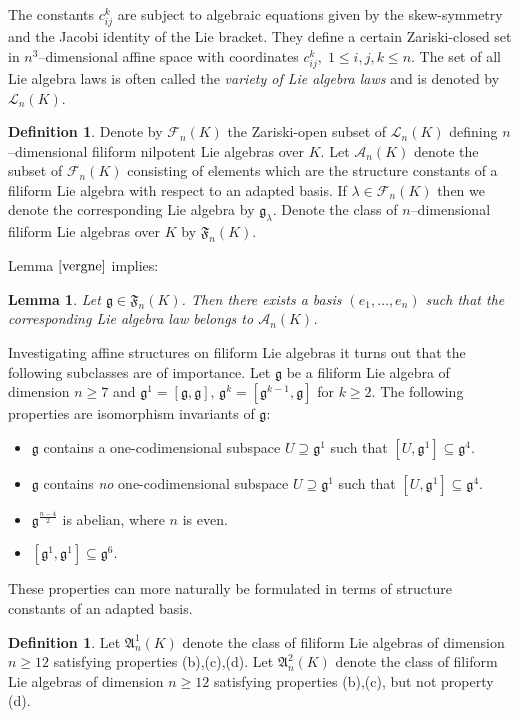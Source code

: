 \documentclass[12pt]{amsart}
\newtheorem{lem}[thm]{Lemma}
\theoremstyle{definition}
\newtheorem{defi}[thm]{Definition}
\theoremstyle{remark}
\newcommand{\Lg}{\mathfrak{g}}
\newcommand{\LA}{\mathfrak{A}}
\newcommand{\LF}{\mathfrak{F}}
\newcommand{\CA}{\mathcal{A}}
\newcommand{\CL}{\mathcal{L}}
\newcommand{\CF}{\mathcal{F}}
\newcommand{\la}{\lambda}
\begin{document}
The constants $c_{ij}^k$ are subject to algebraic equations given by
the skew-symmetry and the Jacobi identity of the Lie bracket.
They define a certain Zariski-closed set in $n^3$--dimensional affine
space with coordinates $c_{ij}^k,\; 1\le i,j,k \le n$.
The set of all Lie algebra laws is often called the {\it variety of
Lie algebra laws} and is denoted by $\CL_n(K)$.

\begin{defi}
Denote by $\CF_n(K)$ the Zariski-open subset of $\CL_n(K)$ defining 
$n$--di\-men\-sio\-nal 
filiform nilpotent Lie algebras over $K$. Let $\CA_n(K)$ denote the subset of
$\CF_n(K)$ consisting of elements which are the structure constants of a
filiform Lie algebra with respect to an adapted basis.
If $\la\in\CF_n(K)$ then we denote the corresponding Lie algebra by
$\Lg_{\la}$. Denote the class of $n$--dimensional filiform Lie algebras
over $K$ by $\LF_n(K)$.
\end{defi}

Lemma $\ref{vergne}$ implies:
\begin{lem}\label{pro}
Let $\Lg\in \LF_n(K)$. Then there exists a basis $(e_1,\ldots ,e_n)$ such
that the corresponding Lie algebra law belongs to $\CA_n(K)$.
\end{lem}

Investigating affine structures on filiform Lie algebras
it turns out that the following subclasses are of importance.
Let $\Lg$ be a filiform Lie algebra of dimension $n\ge 7$ and
$\Lg^1=[\Lg,\Lg],\, \Lg^k=[\Lg^{k-1},\Lg]$ for $k\ge 2$. The following
properties are isomorphism invariants of $\Lg$:
\begin{itemize}
\item[(a)] $\Lg$ contains a one-codimensional subspace $U \supseteq \Lg^1$
such that $[U,\Lg^1]\subseteq \Lg^4$.
\item[(b)] $\Lg$ contains {\it no} one-codimensional subspace $U \supseteq \Lg^1$
such that $[U,\Lg^1]\subseteq \Lg^4$.
\item[(c)] $\Lg^{\frac{n-4}{2}}$
is abelian, where $n$ is even.
\item[(d)] $[\Lg^1,\Lg^1]\subseteq \Lg^6$.
\end{itemize}     

These properties can more naturally be formulated in terms of structure 
constants of an adapted basis. 

\begin{defi}
Let $\LA_n^1(K)$ denote the class of filiform Lie algebras of dimension
$n\ge 12$ satisfying properties (b),(c),(d). 
Let $\LA_n^2(K)$ denote the class of filiform Lie algebras of dimension
$n\ge 12$ satisfying properties (b),(c), but not property (d).
\end{defi}
\end{document}
